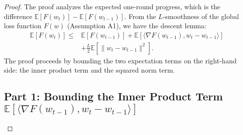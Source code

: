 \documentclass[11pt]{article}
\begin{document}
\begin{proof}
The proof analyzes the expected one-round progress, which is the difference $\mathbb{E}[F(w_t)] - \mathbb{E}[F(w_{t-1})]$. From the $L$-smoothness of the global loss function $F(w)$ (Assumption A1), we have the descent lemma:
\begin{align}
    \mathbb{E}[F(w_t)] \le & \mathbb{E}[F(w_{t-1})] + \mathbb{E}[\langle \nabla F(w_{t-1}), w_t - w_{t-1} \rangle] \nonumber \\
    & + \frac{L}{2}\mathbb{E}[\|w_t - w_{t-1}\|^2]. \label{eq:proof_start_supp}
\end{align}
The proof proceeds by bounding the two expectation terms on the right-hand side: the inner product term and the squared norm term.

\subsection{Part 1: Bounding the Inner Product Term $\mathbb{E}[\langle \nabla F(w_{t-1}), w_t - w_{t-1} \rangle]$}


\end{proof}
\end{document}
